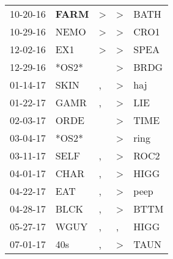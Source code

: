 \begin{supertabular}{p{0.07\textwidth}p{0.06\textwidth}p{0.02\textwidth}p{0.02\textwidth}p{0.06\textwidth}}
          10-20-16\textsuperscript{} &  \textbf{FARM\textsuperscript{}} &     \textgreater &     \textgreater &           BATH\textsuperscript{} \\
          10-29-16\textsuperscript{} &           NEMO\textsuperscript{} &     \textgreater &     \textgreater &           CRO1\textsuperscript{} \\
          12-02-16\textsuperscript{} &            EX1\textsuperscript{} &     \textgreater &     \textgreater &           SPEA\textsuperscript{} \\
          12-29-16\textsuperscript{} &                            *OS2* &                  &     \textgreater &           BRDG\textsuperscript{} \\
          01-14-17\textsuperscript{} &           SKIN\textsuperscript{} &                , &     \textgreater &            haj\textsuperscript{} \\
          01-22-17\textsuperscript{} &           GAMR\textsuperscript{} &                , &     \textgreater &            LIE\textsuperscript{} \\
          02-03-17\textsuperscript{} &           ORDE\textsuperscript{} &                  &     \textgreater &           TIME\textsuperscript{} \\
          03-04-17\textsuperscript{} &                            *OS2* &                  &     \textgreater &           ring\textsuperscript{} \\
          03-11-17\textsuperscript{} &           SELF\textsuperscript{} &                , &     \textgreater &           ROC2\textsuperscript{} \\
          04-01-17\textsuperscript{} &           CHAR\textsuperscript{} &                , &     \textgreater &           HIGG\textsuperscript{} \\
          04-22-17\textsuperscript{} &            EAT\textsuperscript{} &                , &     \textgreater &           peep\textsuperscript{} \\
          04-28-17\textsuperscript{} &           BLCK\textsuperscript{} &                , &     \textgreater &           BTTM\textsuperscript{} \\
          05-27-17\textsuperscript{} &           WGUY\textsuperscript{} &                , &                , &           HIGG\textsuperscript{} \\
          07-01-17\textsuperscript{} &            40s\textsuperscript{} &                , &     \textgreater &           TAUN\textsuperscript{} \\

\end{supertabular}
